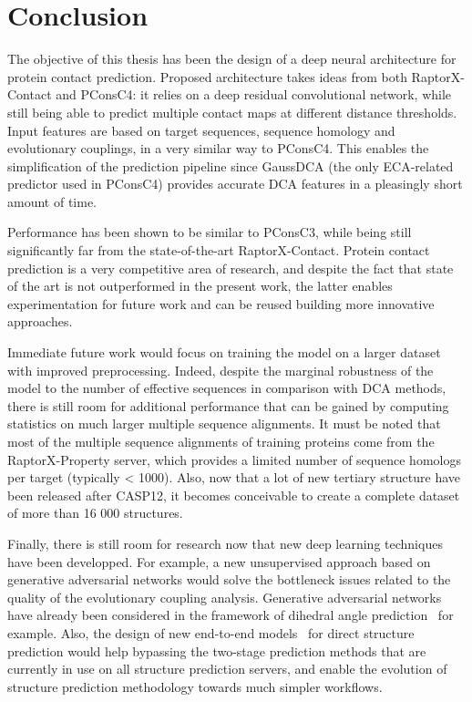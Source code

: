 \chapter{Conclusion}

The objective of this thesis has been the design of a deep neural architecture for protein
contact prediction. Proposed architecture takes ideas from both RaptorX-Contact and PConsC4:
it relies on a deep residual convolutional network, while still being able to predict multiple
contact maps at different distance thresholds. Input features are based on target
sequences, sequence homology and evolutionary couplings, in a very similar way to PConsC4.
This enables the simplification of the prediction pipeline since GaussDCA (the only
ECA-related predictor used in PConsC4) provides accurate DCA features in a pleasingly
short amount of time.

Performance has been shown to be similar to PConsC3, while being still significantly far
from the state-of-the-art RaptorX-Contact. Protein contact prediction is a very competitive
area of research, and despite the fact that state of the art is not outperformed in the present
work, the latter enables experimentation for future work and can be reused building
more innovative approaches.

Immediate future work would focus on training the model on a larger
dataset with improved preprocessing. Indeed, despite the marginal
robustness of the model to the number of effective sequences in comparison
with DCA methods, there is still room for additional performance that can
be gained by computing statistics on much larger multiple sequence alignments.
It must be noted that most of the multiple sequence alignments of training proteins
come from the RaptorX-Property server, which provides a limited number of sequence
homologs per target (typically < 1000).
Also, now that a lot of new tertiary structure have been released after CASP12,
it becomes conceivable to create a complete dataset of more than 16 000 structures.

Finally, there is still room for research now that new deep learning techniques have
been developped. For example, a new unsupervised approach based on generative adversarial
networks would solve the bottleneck issues related to the quality of the evolutionary
coupling analysis. Generative adversarial networks have already been considered in
the framework of dihedral angle prediction~\cite{kim2018dihedral}
for example. Also, the design of new end-to-end models~\cite{alquraishi2019end} for direct
structure prediction would help bypassing the two-stage prediction methods that are currently in 
use on all structure prediction servers, and enable the evolution of structure prediction
methodology towards much simpler workflows.
